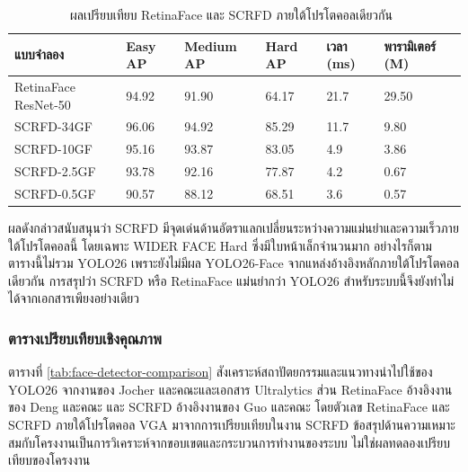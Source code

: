 \begin{table}[H]
\centering
\small
\caption[ผลเปรียบเทียบ RetinaFace และ SCRFD ภายใต้โปรโตคอลเดียวกัน]{ผลเปรียบเทียบ RetinaFace และ SCRFD ภายใต้โปรโตคอลเดียวกัน~\cite{guo2021scrfd}}
\label{tab:face-detector-fair-benchmark}
\begin{tabular}{|p{}|p{}|p{}|p{}|p{}|p{}|}
\hline
\textbf{แบบจำลอง} & \textbf{Easy AP} & \textbf{Medium AP} & \textbf{Hard AP} & \textbf{เวลา (ms)} & \textbf{พารามิเตอร์ (M)} \\
\hline
RetinaFace ResNet-50 & 94.92 & 91.90 & 64.17 & 21.7 & 29.50 \\
\hline
SCRFD-34GF & 96.06 & 94.92 & 85.29 & 11.7 & 9.80 \\
\hline
SCRFD-10GF & 95.16 & 93.87 & 83.05 & 4.9 & 3.86 \\
\hline
SCRFD-2.5GF & 93.78 & 92.16 & 77.87 & 4.2 & 0.67 \\
\hline
SCRFD-0.5GF & 90.57 & 88.12 & 68.51 & 3.6 & 0.57 \\
\hline
\end{tabular}
\end{table}

ผลดังกล่าวสนับสนุนว่า SCRFD มีจุดเด่นด้านอัตราแลกเปลี่ยนระหว่างความแม่นยำและความเร็วภายใต้โปรโตคอลนี้ โดยเฉพาะ WIDER FACE Hard ซึ่งมีใบหน้าเล็กจำนวนมาก อย่างไรก็ตาม ตารางนี้ไม่รวม YOLO26 เพราะยังไม่มีผล YOLO26-Face จากแหล่งอ้างอิงหลักภายใต้โปรโตคอลเดียวกัน การสรุปว่า SCRFD หรือ RetinaFace แม่นยำกว่า YOLO26 สำหรับระบบนี้จึงยังทำไม่ได้จากเอกสารเพียงอย่างเดียว

\subsubsection{ตารางเปรียบเทียบเชิงคุณภาพ}

ตารางที่ \ref{tab:face-detector-comparison} สังเคราะห์สถาปัตยกรรมและแนวทางนำไปใช้ของ YOLO26 จากงานของ Jocher และคณะและเอกสาร Ultralytics \cite{jocher2026yolo26,ultralytics2026yolo26docs} ส่วน RetinaFace อ้างอิงงานของ Deng และคณะ \cite{deng2020retinaface} และ SCRFD อ้างอิงงานของ Guo และคณะ \cite{guo2021scrfd} โดยตัวเลข RetinaFace และ SCRFD ภายใต้โปรโตคอล VGA มาจากการเปรียบเทียบในงาน SCRFD ข้อสรุปด้านความเหมาะสมกับโครงงานเป็นการวิเคราะห์จากขอบเขตและกระบวนการทำงานของระบบ ไม่ใช่ผลทดลองเปรียบเทียบของโครงงาน

